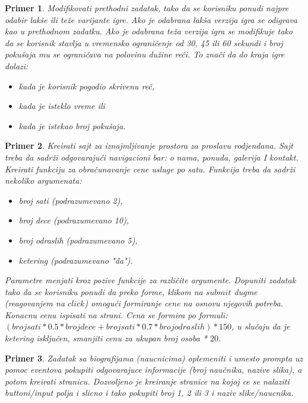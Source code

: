 \documentclass[a4paper]{article}
\newtheorem{primer}{Primer}[section]
\begin{document}
\begin{primer}
Modifikovati prethodni zadatak, tako da se korisniku ponudi najpre odabir lakše ili teže varijante igre. Ako je odabrana lakša verzija igra se odigrava kao u prethodnom zadatku.  Ako je odabrana teža verzija igra se modifikuje tako da se korisnik stavlja u vremensko ograničenje od 30, 45 ili 60 sekundi i broj pokušaja mu se ograničava na polovinu dužine reči. To znači da do kraja igre dolazi:
\begin{itemize}
\item kada je korisnik pogodio skrivenu reč,
\item kada je isteklo vreme ili
\item kada je istekao broj pokušaja.
\end{itemize}
\end{primer}

\begin{primer}
Kreirati sajt za iznajmljivanje prostora za proslavu rodjendana. Sajt treba da sadrži odgovarajući
 navigacioni bar: o nama, ponuda, galerija I kontakt. 
 Kreirati funkciju za obračunavanje cene usluge po satu. 
 Funkcija treba da sadrži nekoliko argumenata:
\begin{itemize}
 \item broj sati (podrazumevano 2), 
 \item broj dece (podrazumevano 10),
 \item broj odraslih (podrazumevano 5),
 \item ketering (podrazumevano "da"). 
\end{itemize}  
Parametre menjati kroz pozive funkcije za različite argumente. Dopuniti zadatak tako da se korisniku
ponudi da preko forme, klikom na $submit$ dugme (reagovanjem na $click$) omogući formiranje cene 
na osnovu njegovih potreba. Konacnu cenu ispisati na strani.  
Cena se formira po formuli:
     $(brojsati*0.5*brojdece + brojsati*0.7*brojodraslih) *150$, 
u slučaju da je ketering isključen, smanjiti cenu za ukupan broj osoba * $20$. 
\end{primer}

\begin{primer}
Zadatak sa biografijama (naucnicima) oplemeniti i umesto prompta uz pomoc eventova
pokupiti odgovarajuce informacije (broj naučnika, nazive slika), a potom kreirati stranicu. Dozvoljeno je kreiranje stranice na kojoj ce se nalaziti buttoni/input polja i slicno i tako pokupiti broj 1, 2 ili 3 i naziv slike/naucnika.
\end{primer}
\end{document}
